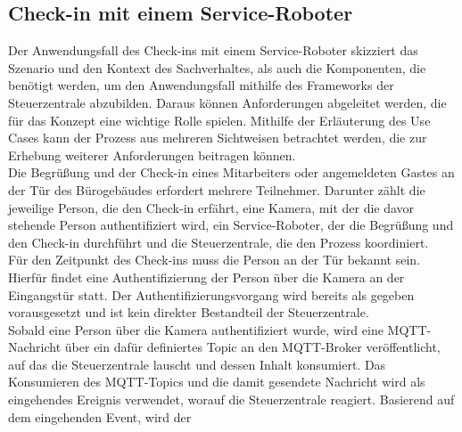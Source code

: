 \subsection{Check-in mit einem Service-Roboter}
\label{subsec:checkin}
    Der Anwendungsfall des Check-ins mit einem Service-Roboter skizziert das Szenario und den Kontext des Sachverhaltes, als 
    auch die Komponenten, die benötigt werden, um den Anwendungsfall mithilfe des Frameworks der Steuerzentrale abzubilden. 
    Daraus können Anforderungen abgeleitet werden, die für das Konzept eine wichtige Rolle spielen. Mithilfe der 
    Erläuterung des Use Cases kann der Prozess aus mehreren Sichtweisen betrachtet werden, die zur Erhebung weiterer 
    Anforderungen beitragen können. 
    \\
    \linebreak
    Die Begrüßung und der Check-in eines Mitarbeiters oder angemeldeten Gastes an der Tür des Bürogebäudes erfordert mehrere Teilnehmer. 
    Darunter zählt die jeweilige Person, die den Check-in erfährt, eine Kamera, mit der die davor stehende Person authentifiziert wird, 
    ein Service-Roboter, der die Begrüßung und den Check-in durchführt und die Steuerzentrale, die den Prozess koordiniert. 
    \\
    \linebreak
    Für den Zeitpunkt des Check-ins muss die Person an 
    der Tür bekannt sein. Hierfür findet eine Authentifizierung der Person über die Kamera an der Eingangstür statt. Der 
    Authentifizierungsvorgang wird bereits als gegeben vorausgesetzt und ist kein direkter Bestandteil der Steuerzentrale. 
    \\
    Sobald eine Person über die Kamera authentifiziert wurde, wird eine \acs{MQTT}-Nachricht über ein dafür definiertes Topic 
    an den \acs{MQTT}-Broker veröffentlicht, 
    auf das die Steuerzentrale lauscht und dessen Inhalt konsumiert. Das Konsumieren des \acs{MQTT}-Topics und die damit gesendete 
    Nachricht wird als eingehendes Ereignis verwendet, worauf die Steuerzentrale reagiert. Basierend auf dem eingehenden Event, wird der 
